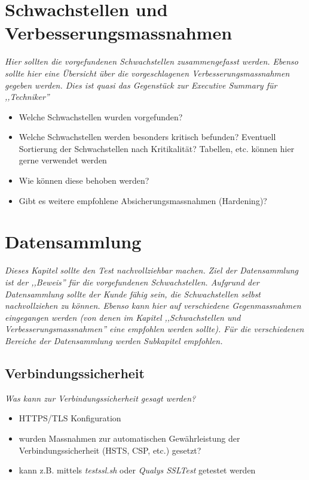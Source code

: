\documentclass[12pt,a4paper]{report}
\begin{document}
\chapter{Schwachstellen und Verbesserungsmassnahmen}

\textit{Hier sollten die vorgefundenen Schwachstellen zusammengefasst werden. Ebenso sollte hier eine Übersicht über die vorgeschlagenen Verbesserungsmassnahmen gegeben werden. Dies ist quasi das Gegenstück zur Executive Summary für ,,Techniker''}

\begin{itemize}
				\item Welche Schwachstellen wurden vorgefunden?
				\item Welche Schwachstellen werden besonders kritisch befunden? Eventuell Sortierung der Schwachstellen nach Kritikalität? Tabellen, etc. können hier gerne verwendet werden
				\item Wie können diese behoben werden?
				\item Gibt es weitere empfohlene Absicherungsmassnahmen (Hardening)?
\end{itemize}

\chapter{Datensammlung}

\textit{Dieses Kapitel sollte den Test nachvollziehbar machen. Ziel der Datensammlung ist der ,,Beweis'' für die vorgefundenen Schwachstellen. Aufgrund der Datensammlung sollte der Kunde fähig sein, die Schwachstellen selbst nachvollziehen zu können. Ebenso kann hier auf verschiedene Gegenmassnahmen eingegangen werden (von denen im Kapitel ,,Schwachstellen und Verbesserungsmassnahmen'' eine empfohlen werden sollte). Für die verschiedenen Bereiche der Datensammlung werden Subkapitel empfohlen.}

\section{Verbindungssicherheit}

\textit{Was kann zur Verbindungssicherheit gesagt werden?}

\begin{itemize}
				\item HTTPS/TLS Konfiguration
				\item wurden Massnahmen zur automatischen Gewährleistung der Verbindungssicherheit (HSTS, CSP, etc.) gesetzt?
				\item kann z.B. mittels \textit{testssl.sh} oder \textit{Qualys SSLTest} getestet werden
\end{itemize}
\end{document}
